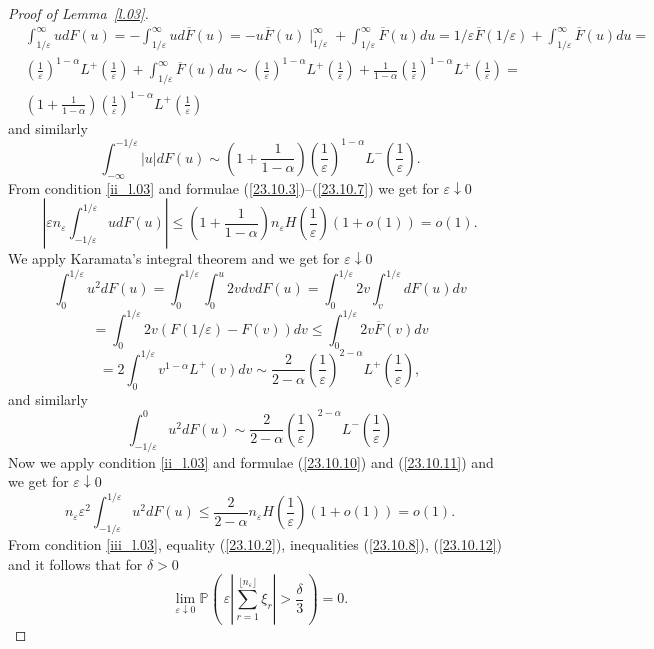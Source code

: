 \documentclass{article}
\theoremstyle{plain}
\theoremstyle{definition}
\theoremstyle{remark}
\newcommand{\p}[2][]{{\mathbb{P}}_{#1} \left( \, #2 \, \right) } %
\newcommand{\beq}{\begin{equation}}
\newcommand{\eeq}{\end{equation}}
\begin{document}
\begin{proof}[Proof of Lemma~\ref{l.03}]
\begin{align}
& \int_{1/\varepsilon}^{\infty} u dF(u) = -\int_{1/\varepsilon}^{\infty} u d\overline{F}(u) = -u\overline{F}(u) \mid_{1/\varepsilon}^{\infty} + \int_{1/\varepsilon}^{\infty} \overline{F}(u) du = 1/\varepsilon \overline{F}(1/\varepsilon) + \int_{1/\varepsilon}^{\infty} \overline{F}(u) du = \nonumber \\
& \left(\frac{1}{\varepsilon}\right)^{1-\alpha} L^+\left(\frac{1}{\varepsilon}\right) + \int_{1/\varepsilon}^{\infty} \overline{F}(u) du \sim \left(\frac{1}{\varepsilon}\right)^{1-\alpha} L^+\left(\frac{1}{\varepsilon}\right) + \frac{1}{1-\alpha}\left(\frac{1}{\varepsilon}\right)^{1-\alpha} L^+\left(\frac{1}{\varepsilon}\right) = \nonumber \\
& \left( 1 + \frac{1}{1-\alpha} \right) \left(\frac{1}{\varepsilon}\right)^{1-\alpha} L^+\left(\frac{1}{\varepsilon}\right) 
\end{align}
and similarly
\beq\label{23.10.7}
\int_{-\infty}^{ -1/\varepsilon} |u| dF(u)\sim \left( 1 + \frac{1}{1-\alpha} \right)\left(\frac{1}{\varepsilon}\right)^{1-\alpha}L^-\left(\frac{1}{\varepsilon}\right).
\eeq
From condition \ref{ii_l.03} and formulae (\ref{23.10.3})--(\ref{23.10.7}) we get for $\varepsilon\downarrow 0$ 
\beq\label{23.10.8}
\left|\varepsilon n_\varepsilon \int_{-1/\varepsilon}^{1/\varepsilon} u dF(u)\right|\leqslant \left( 1 + \frac{1}{1-\alpha} \right)n_\varepsilon H\left(\frac{1}{\varepsilon}\right)(1+o(1))=o(1).
\eeq
We apply Karamata's integral theorem and we get for $\varepsilon\downarrow 0$
$$
\int_{0}^{1/\varepsilon} u^2 dF(u)
=\int_{0}^{1/\varepsilon}\int_{0}^{u} 2v dv dF(u)
=\int_{0}^{1/\varepsilon}2v\int_{v}^{1/\varepsilon}dF(u) dv
$$
$$
=\int_{0}^{1/\varepsilon}2v
(F(1/\varepsilon)-F(v))dv\leq
\int_{0}^{1/\varepsilon}2v
\overline{F}(v)dv
$$
\beq\label{23.10.10}
=2\int_{0}^{1/\varepsilon}v^{1-\alpha}
L^+(v)dv
\sim\frac{2}{2-\alpha}\left(\frac{1}{\varepsilon}\right)^{2-\alpha} L^+\left(\frac{1}{\varepsilon}\right),
\eeq
and similarly
\beq\label{23.10.11}
\int_{-1/\varepsilon}^{0} u^2 dF(u)
\sim\frac{2}{2-\alpha}\left(\frac{1}{\varepsilon}\right)^{2-\alpha} L^-\left(\frac{1}{\varepsilon}\right)
\eeq
Now we apply condition \ref{ii_l.03} and formulae (\ref{23.10.10}) and (\ref{23.10.11}) and we get for $\varepsilon\downarrow 0$
\beq\label{23.10.12}
n_\varepsilon \varepsilon^2
 \int_{-1/\varepsilon}^{1/\varepsilon} u^2 dF(u)\leqslant 
 \frac{2}{2-\alpha}n_\varepsilon H\left(\frac{1}{\varepsilon}\right)(1+o(1))=o(1).
\eeq
From condition \ref{iii_l.03}, equality (\ref{23.10.2}), inequalities (\ref{23.10.8}), (\ref{23.10.12})
and \citet[theorem 5, page 211]{petrov1987limit} it follows that for $\delta>0$
\beq\label{23.10.14}
\lim\limits_{\varepsilon\downarrow 0}\p{\varepsilon\left|\sum\limits_{r=1}^{\lfloor n_\varepsilon \rfloor}\xi_r\right|>\frac{\delta}{3}}=0.
\eeq


\end{proof}
\end{document}
